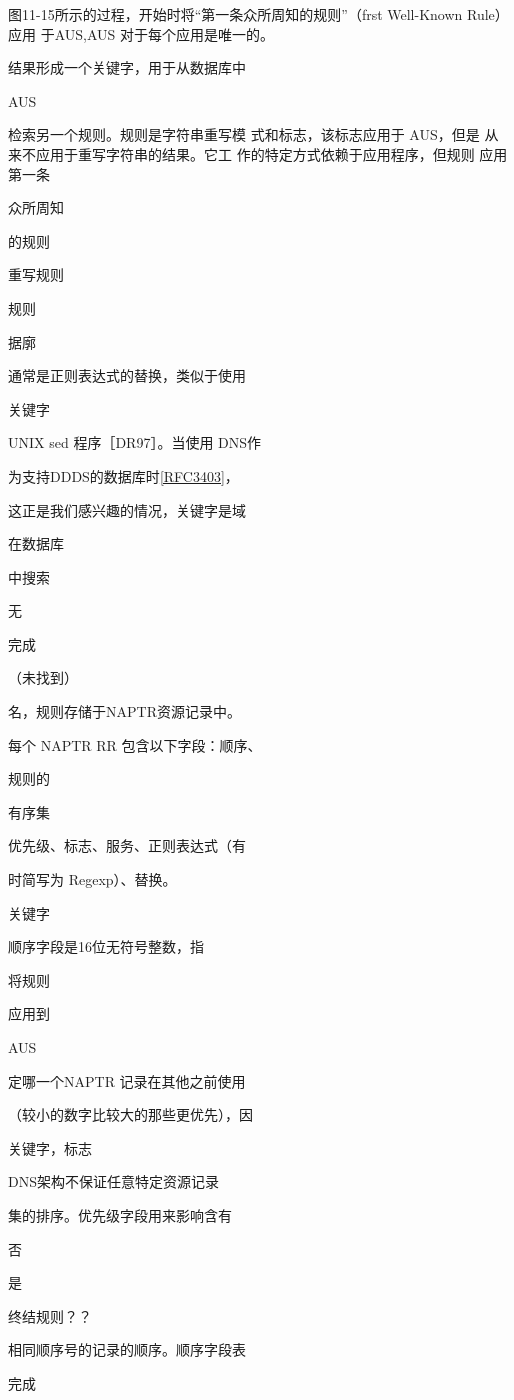 图11-15所示的过程，开始时将“第一条众所周知的规则”（frst Well-Known Rule）应用
于AUS,AUS 对于每个应用是唯一的。

结果形成一个关键字，用于从数据库中

AUS

检索另一个规则。规则是字符串重写模
式和标志，该标志应用于 AUS，但是
从来不应用于重写字符串的结果。它工
作的特定方式依赖于应用程序，但规则
应用第一条

众所周知

的规则

重写规则

规则

据廓

通常是正则表达式的替换，类似于使用

关键字

UNIX sed 程序［DR97］。当使用 DNS作

为支持DDDS的数据库时\href{https://www.rfc-editor.org/rfc/rfc3403}{[RFC3403]}，

这正是我们感兴趣的情况，关键字是域

在数据库

中搜索

无

完成

（未找到）

名，规则存储于NAPTR资源记录中。

每个 NAPTR RR 包含以下字段：顺序、

规则的

有序集

优先级、标志、服务、正则表达式（有

时简写为 Regexp）、替换。

关键字

顺序字段是16位无符号整数，指

将规则

应用到

AUS

定哪一个NAPTR 记录在其他之前使用

（较小的数字比较大的那些更优先），因

关键字，标志

DNS架构不保证任意特定资源记录

集的排序。优先级字段用来影响含有

否

是

终结规则？？

相同顺序号的记录的顺序。顺序字段表

完成

